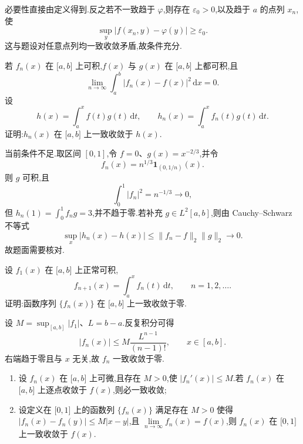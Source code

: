 \begin{solution}
    必要性直接由定义得到.反之若不一致趋于 $\varphi$,则存在 $\varepsilon_0>0$,以及趋于 $a$ 的点列 $x_n$,使
    \[
        \sup_y|f(x_n,y)-\varphi(y)|\geq\varepsilon_0.
    \]
    这与题设对任意点列均一致收敛矛盾,故条件充分.
\end{solution}

\begin{example}
    若 $f_n(x)$ 在 $\lbrack a,b\rbrack$ 上可积,$f(x)$ 与 $g(x)$ 在 $\lbrack a,b\rbrack$ 上都可积,且
    \[
        \lim\limits_{n\to\infty}\int_a^b|f_n(x)-f(x)|^2\,\mathrm{d}x=0.
    \]
    设
    \[
        h(x)=\int_a^x f(t)g(t)\,\mathrm{d}t,
        \qquad
        h_n(x)=\int_a^x f_n(t)g(t)\,\mathrm{d}t.
    \]
    证明:$h_n(x)$ 在 $\lbrack a,b\rbrack$ 上一致收敛于 $h(x)$.
\end{example}
\exampleblank

\begin{solution}
    当前条件不足.取区间 $[0,1]$,令 $f=0$、$g(x)=x^{-2/3}$,并令
    \[
        f_n(x)=n^{1/3}\mathbf1_{(0,1/n)}(x).
    \]
    则 $g$ 可积,且
    \[
        \int_0^1|f_n|^2=n^{-1/3}\to0,
    \]
    但 $h_n(1)=\int_0^1f_ng=3$,并不趋于零.若补充 $g\in L^2[a,b]$,则由 Cauchy--Schwarz 不等式
    \[
        \sup_x|h_n(x)-h(x)|
        \leq\|f_n-f\|_2\|g\|_2\longrightarrow0.
    \]
    故题面需要核对.
\end{solution}

\begin{example}
    设 $f_1(x)$ 在 $\lbrack a,b\rbrack$ 上正常可积,
    \[
        f_{n+1}(x)=\int_a^x f_n(t)\,\mathrm{d}t,
        \qquad n=1,2,\ldots.
    \]
    证明:函数序列 $\{f_n(x)\}$ 在 $\lbrack a,b\rbrack$ 上一致收敛于零.
\end{example}
\exampleblank

\begin{solution}
    设 $M=\sup_{[a,b]}|f_1|$、$L=b-a$.反复积分可得
    \[
        |f_n(x)|\leq M\dfrac{L^{n-1}}{(n-1)!},
        \qquad x\in[a,b].
    \]
    右端趋于零且与 $x$ 无关,故 $f_n$ 一致收敛于零.
\end{solution}

\begin{example}
    \begin{enumerate}
        \item 设 $f_n(x)$ 在 $\lbrack a,b\rbrack$ 上可微,且存在 $M>0$,使 $|f_n'(x)|\leq M$.若 $f_n(x)$ 在 $\lbrack a,b\rbrack$ 上逐点收敛于 $f(x)$,则必一致收敛;
        \item 设定义在 $\lbrack 0,1\rbrack$ 上的函数列 $\{f_n(x)\}$ 满足存在 $M>0$ 使得
              $|f_n(x)-f_n(y)|\leq M|x-y|$,且 $\displaystyle\lim\limits_{n\to\infty}f_n(x)=f(x)$,则 $f_n(x)$ 在 $\lbrack 0,1\rbrack$ 上一致收敛于 $f(x)$.
    \end{enumerate}
\end{example}
\exampleblank

